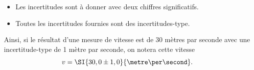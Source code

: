 \begin{prerequis}
\begin{itemize}
  \item Les incertitudes sont à donner avec deux chiffres significatifs.
  \item Toutes les incertitudes fournies sont des incertitudes-type.
\end{itemize}
	
	Ainsi, si le résultat d'une mesure de vitesse est de 30 mètres par seconde avec une incertitude-type de 1 mètre par seconde, on notera cette vitesse 
	\[
	v=\SI{30,0\pm 1,0}{\metre\per\second}.
	\]
\end{prerequis}










\hauteurLargeurCadreReponse		{6mm}{3cm}
\initialisationEntrainement

